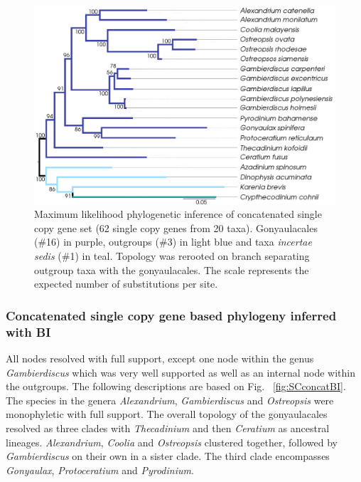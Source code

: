\documentclass[fleqn,10pt,lineno]{wlpeerj} %
\begin{document}
\begin{figure}[ht]
\centering
\includegraphics[width=\linewidth]{gonya-figs/SC-concat-ML-WAG.png} 
\caption{Maximum likelihood phylogenetic inference of concatenated single copy gene set (62 single copy genes from 20 taxa). Gonyaulacales (\#16) in purple, outgroups (\#3) in light blue and taxa \textit{incertae sedis} (\#1) in teal. Topology was rerooted on branch separating outgroup taxa with the gonyaulacales. The scale represents the expected number of substitutions per site.} 
\label{fig:SCconcatML}
\end{figure} 

\subsubsection*{Concatenated single copy gene based phylogeny inferred with BI}
All nodes resolved with full support, except one node within the genus \textit{Gambierdiscus} which was very well supported as well as an internal node within the outgroups. 
The following descriptions are based on Fig. ~\ref{fig:SCconcatBI}. 
The species in the genera \textit{Alexandrium}, \textit{Gambierdiscus} and \textit{Ostreopsis} were monophyletic with full support. 
The overall topology of the gonyaulacales resolved as three clades with \textit{Thecadinium} and then \textit{Ceratium} as ancestral lineages. 
\textit{Alexandrium}, \textit{Coolia} and \textit{Ostreopsis} clustered together, followed by \textit{Gambierdiscus} on their own in a sister clade. 
The third clade encompasses \textit{Gonyaulax}, \textit{Protoceratium} and \textit{Pyrodinium}. 
\end{document}
